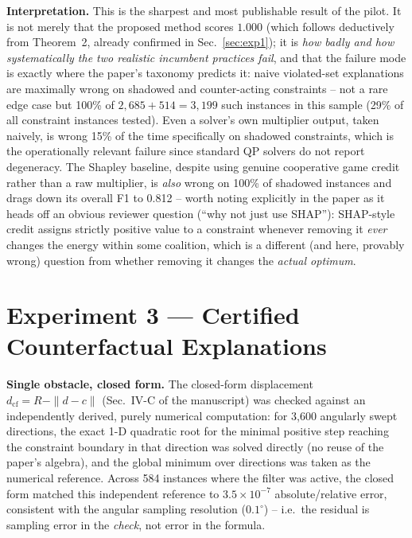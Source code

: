 \documentclass[11pt]{article}
\begin{document}
\textbf{Interpretation.} This is the sharpest and most publishable result of
the pilot. It is not merely that the proposed method scores $1.000$ (which
follows deductively from Theorem~2, already confirmed in
Sec.~\ref{sec:exp1}); it is \emph{how badly and how systematically the two
realistic incumbent practices fail}, and that the failure mode is exactly
where the paper's taxonomy predicts it: naive violated-set explanations are
maximally wrong on shadowed and counter-acting constraints -- not a rare edge
case but 100\% of $2{,}685{+}514=3{,}199$ such instances in this sample (29\%
of all constraint instances tested). Even a solver's own multiplier output,
taken naively, is wrong 15\% of the time specifically on shadowed constraints,
which is the operationally relevant failure since standard QP solvers do not
report degeneracy. The Shapley baseline, despite using genuine cooperative
game credit rather than a raw multiplier, is \emph{also} wrong on 100\% of
shadowed instances and drags down its overall F1 to 0.812 -- worth noting
explicitly in the paper as it heads off an obvious reviewer question (``why
not just use SHAP''): SHAP-style credit assigns strictly positive value to a
constraint whenever removing it \emph{ever} changes the energy within some
coalition, which is a different (and here, provably wrong) question from
whether removing it changes the \emph{actual optimum}.

\section{Experiment 3 --- Certified Counterfactual Explanations}
\label{sec:exp3}

\textbf{Single obstacle, closed form.} The closed-form displacement
$d_{\mathrm{cf}}=R-\|d-c\|$ (Sec.~IV-C of the manuscript) was checked against
an independently derived, purely numerical computation: for 3{,}600 angularly
swept directions, the exact 1-D quadratic root for the minimal positive step
reaching the constraint boundary in that direction was solved directly (no
reuse of the paper's algebra), and the global minimum over directions was
taken as the numerical reference. Across 584 instances where the filter was
active, the closed form matched this independent reference to
$3.5\times10^{-7}$ absolute/relative error, consistent with the angular
sampling resolution ($0.1^\circ$) -- i.e.\ the residual is sampling error in
the \emph{check}, not error in the formula.
\end{document}
